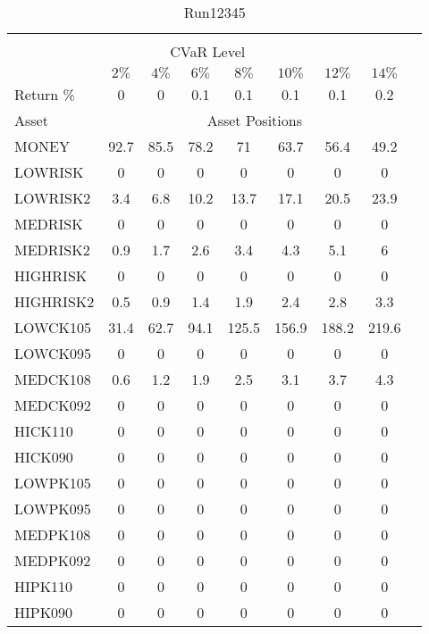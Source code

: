\begin{table}[h!t]
\caption{Run12345}
\centering
\begin{tabular}[t]{ l c c c c c c c c }
\hline\hline \\
\multicolumn{8}{c}{CVaR Level} \\
 & $2\%$ & $4\%$ & $6\%$ & $8\%$ & $10\%$ & $12\%$ & $14\%$ \\[0.5ex]
Return \% &0 &0 &0.1 &0.1 &0.1 &0.1 &0.2\\[0.5ex]
Asset & \multicolumn{7}{c}{Asset Positions} \\[1ex]
MONEY & 92.7 & 85.5 & 78.2 & 71 & 63.7 & 56.4 & 49.2\\
LOWRISK & 0 & 0 & 0 & 0 & 0 & 0 & 0\\
LOWRISK2 & 3.4 & 6.8 & 10.2 & 13.7 & 17.1 & 20.5 & 23.9\\
MEDRISK & 0 & 0 & 0 & 0 & 0 & 0 & 0\\
MEDRISK2 & 0.9 & 1.7 & 2.6 & 3.4 & 4.3 & 5.1 & 6\\
HIGHRISK & 0 & 0 & 0 & 0 & 0 & 0 & 0\\
HIGHRISK2 & 0.5 & 0.9 & 1.4 & 1.9 & 2.4 & 2.8 & 3.3\\
LOWCK105 & 31.4 & 62.7 & 94.1 & 125.5 & 156.9 & 188.2 & 219.6\\
LOWCK095 & 0 & 0 & 0 & 0 & 0 & 0 & 0\\
MEDCK108 & 0.6 & 1.2 & 1.9 & 2.5 & 3.1 & 3.7 & 4.3\\
MEDCK092 & 0 & 0 & 0 & 0 & 0 & 0 & 0\\
HICK110 & 0 & 0 & 0 & 0 & 0 & 0 & 0\\
HICK090 & 0 & 0 & 0 & 0 & 0 & 0 & 0\\
LOWPK105 & 0 & 0 & 0 & 0 & 0 & 0 & 0\\
LOWPK095 & 0 & 0 & 0 & 0 & 0 & 0 & 0\\
MEDPK108 & 0 & 0 & 0 & 0 & 0 & 0 & 0\\
MEDPK092 & 0 & 0 & 0 & 0 & 0 & 0 & 0\\
HIPK110 & 0 & 0 & 0 & 0 & 0 & 0 & 0\\
HIPK090 & 0 & 0 & 0 & 0 & 0 & 0 & 0\\
[1ex] \hline
\end{tabular}
\end{table} 